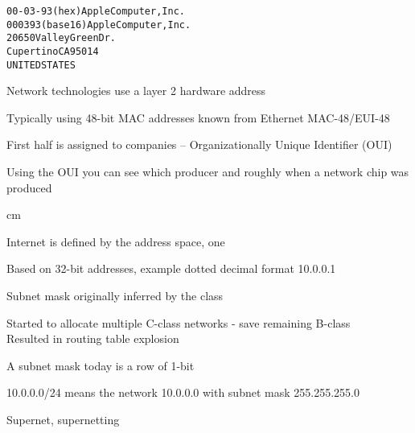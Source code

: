 \documentclass[Screen16to9,17pt]{foils}
\begin{document}
\begin{alltt}
00-03-93   (hex)        Apple Computer, Inc.
000393     (base 16)    Apple Computer, Inc.
                        20650 Valley Green Dr.
                        Cupertino CA 95014
                        UNITED STATES
\end{alltt}
\begin{list1}
\item Network technologies use a layer 2 hardware address
\item Typically using 48-bit MAC addresses known from Ethernet MAC-48/EUI-48
\item First half is assigned to companies -- Organizationally Unique Identifier (OUI)
\item Using the OUI you can see which producer and roughly when a network chip was produced
\item {}
\end{list1}



 cm

\begin{list2}
\item Internet is defined by the address space, one
\item Based on 32-bit addresses, example dotted decimal format 10.0.0.1
\end{list2}




\begin{list2}
\item Subnet mask originally inferred by the class
\item Started to allocate multiple C-class networks - save remaining B-class\\
Resulted in routing table explosion
\item A subnet mask today is a row of 1-bit
\item 10.0.0.0/24 means the network 10.0.0.0 with subnet mask 255.255.255.0
\item Supernet, supernetting
\end{list2}




{\footnotesize {}}
\end{document}
